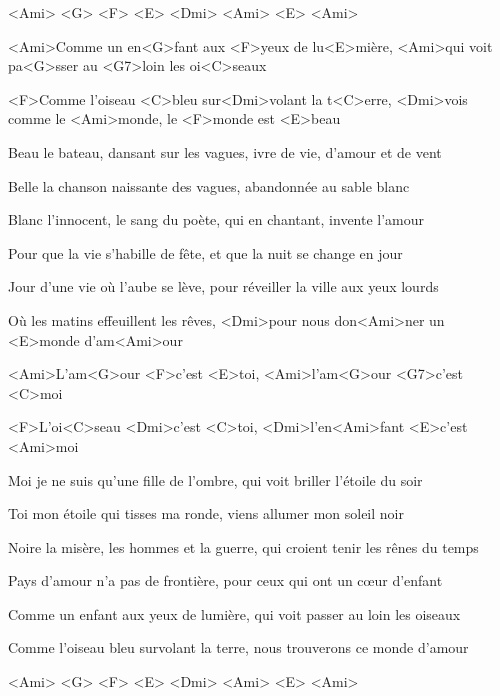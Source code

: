 

<Ami> <G> <F> <E>
<Dmi> <Ami> <E> <Ami>

\zs
<Ami>Comme un en<G>fant aux <F>yeux de lu<E>mière, <Ami>qui voit pa<G>sser au <G7>loin les oi<C>seaux

<F>Comme l'oiseau <C>bleu sur<Dmi>volant la t<C>erre, <Dmi>vois comme le <Ami>monde, le <F>monde est <E>beau
\ks

\zs
Beau le bateau, dansant sur les vagues, ivre de vie, d'amour et de vent

Belle la chanson naissante des vagues, abandonnée au sable blanc
\ks

\zs
Blanc l'innocent, le sang du poète, qui en chantant, invente l'amour

Pour que la vie s'habille de fête, et que la nuit se change en jour
\ks

\zs
Jour d'une vie où l'aube se lève, pour réveiller la ville aux yeux lourds

Où les matins effeuillent les rêves, <Dmi>pour nous don<Ami>ner un <E>monde d'am<Ami>our
\ks

\zr
<Ami>L'am<G>our <F>c'est <E>toi, <Ami>l'am<G>our <G7>c'est <C>moi

<F>L'oi<C>seau <Dmi>c'est <C>toi, <Dmi>l'en<Ami>fant <E>c'est <Ami>moi
\kr

\zs
Moi je ne suis qu'une fille de l'ombre, qui voit briller l'étoile du soir

Toi mon étoile qui tisses ma ronde, viens allumer mon soleil noir
\ks

\zs
Noire la misère, les hommes et la guerre, qui croient tenir les rênes du temps

Pays d'amour n'a pas de frontière, pour ceux qui ont un cœur d'enfant
\ks

\zs
Comme un enfant aux yeux de lumière, qui voit passer au loin les oiseaux

Comme l'oiseau bleu survolant la terre, nous trouverons ce monde d'amour
\ks

\zr\kr

\zr\kr

<Ami> <G> <F> <E>
<Dmi> <Ami> <E> <Ami>

\kp
